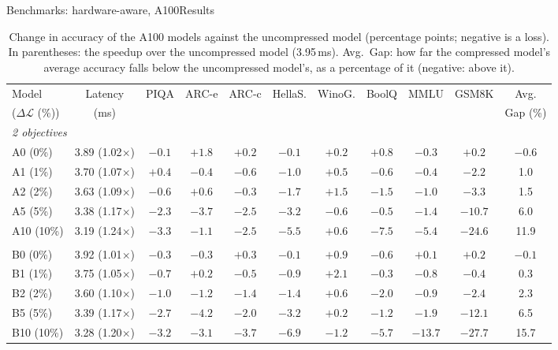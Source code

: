 \documentclass[aspectratio=169,10pt]{beamer}
\newcommand{\dloss}{\Delta\mathcal{L}}
\begin{document}
\begin{frame}{Benchmarks: hardware-aware, A100}{Results}
\begin{table}
\centering
\begin{adjustbox}{width=\linewidth, totalheight=0.64\textheight, keepaspectratio, center}
\centering
\small
\setlength{\tabcolsep}{3pt}
\begin{tabular}{lcccccccccc}
\toprule
Model & Latency & PIQA & ARC-e & ARC-c & HellaS. & WinoG. & BoolQ & MMLU & GSM8K & Avg. \\
($\dloss$ (\%)) & (ms)   &      &       &       &         &        &       &      &       & Gap (\%) \\
\midrule
\multicolumn{11}{l}{\emph{2 objectives}} \\
A0  (0\%)  & 3.89 (1.02$\times$) & $-0.1$ & $+1.8$ & $+0.2$ & $-0.1$ & $+0.2$ & $+0.8$ & $-0.3$ & $+0.2$  & $-0.6$ \\
A1  (1\%)  & 3.70 (1.07$\times$) & $+0.4$ & $-0.4$ & $-0.6$ & $-1.0$ & $+0.5$ & $-0.6$ & $-0.4$ & $-2.2$  & 1.0 \\
A2  (2\%)  & 3.63 (1.09$\times$) & $-0.6$ & $+0.6$ & $-0.3$ & $-1.7$ & $+1.5$ & $-1.5$ & $-1.0$ & $-3.3$  & 1.5 \\
A5  (5\%)  & 3.38 (1.17$\times$) & $-2.3$ & $-3.7$ & $-2.5$ & $-3.2$ & $-0.6$ & $-0.5$ & $-1.4$ & $-10.7$ & 6.0 \\
A10 (10\%) & 3.19 (1.24$\times$) & $-3.3$ & $-1.1$ & $-2.5$ & $-5.5$ & $+0.6$ & $-7.5$ & $-5.4$ & $-24.6$ & 11.9 \\
\addlinespace
\multicolumn{11}{l}{\emph{3 objectives}} \\
B0  (0\%)  & 3.92 (1.01$\times$) & $-0.3$ & $-0.3$ & $+0.3$ & $-0.1$ & $+0.9$ & $-0.6$ & $+0.1$ & $+0.2$  & $-0.1$ \\
B1  (1\%)  & 3.75 (1.05$\times$) & $-0.7$ & $+0.2$ & $-0.5$ & $-0.9$ & $+2.1$ & $-0.3$ & $-0.8$ & $-0.4$  & 0.3 \\
B2  (2\%)  & 3.60 (1.10$\times$) & $-1.0$ & $-1.2$ & $-1.4$ & $-1.4$ & $+0.6$ & $-2.0$ & $-0.9$ & $-2.4$  & 2.3 \\
B5  (5\%)  & 3.39 (1.17$\times$) & $-2.7$ & $-4.2$ & $-2.0$ & $-3.2$ & $+0.2$ & $-1.2$ & $-1.9$ & $-12.1$ & 6.5 \\
B10 (10\%) & 3.28 (1.20$\times$) & $-3.2$ & $-3.1$ & $-3.7$ & $-6.9$ & $-1.2$ & $-5.7$ & $-13.7$ & $-27.7$ & 15.7 \\
\bottomrule
\end{tabular}
\end{adjustbox}
\caption{Change in accuracy of the A100 models against the uncompressed model (percentage points;
negative is a loss). In parentheses: the speedup over the uncompressed model (3.95\,ms). Avg.\ Gap: how far the compressed model's average accuracy falls below the uncompressed model's, as a percentage of it (negative: above it).}\label{tab:a100delta}
\end{table}
\end{frame}
\end{document}
